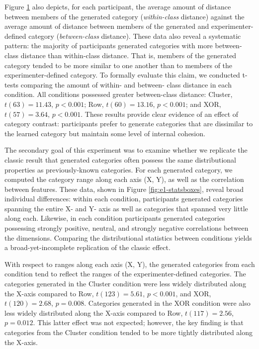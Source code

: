 \documentclass[12pt]{article}
\newcommand\nbcnote[1]{\todo[inline, backgroundcolor = yellow]{\textbf{NBC}: #1}}
\begin{document}
\begin{flushleft}
\begin{figure}
\begin{center}
    \nbcnote{Need to check on how nice the journal is about color figs!}

    \label{fig:e1-distanceplots}
    \end{center}
\end{figure}


Figure \ref{fig:e1-distanceplots} also depicts, for each participant, the average amount of distance between members of the generated category (\textit{within-class} distance) against the average amount of distance between members of the generated and experimenter-defined category (\textit{between-class} distance). These data also reveal a systematic pattern: the majority of participants generated categories with more between-class distance than within-class distance. That is, members of the generated category tended to be more similar to one another than to members of the experimenter-defined category. To formally evaluate this claim, we conducted t-tests comparing the amount of within- and between- class distance in each condition. All conditions possessed greater between-class distance: Cluster, $t(63) = 11.43$, $p < 0.001$; Row, $t(60) = 13.16$, $p < 0.001$; and XOR, $t(57) = 3.64$, $p < 0.001$. These results provide clear evidence of an effect of category contrast: participants prefer to generate categories that are dissimilar to the learned category but maintain some level of internal cohesion. 

The secondary goal of this experiment was to examine whether we replicate the classic result that generated categories often possess the same distributional properties as previously-known categories. For each generated category, we computed the category range along each axis (X, Y), as well as the correlation between features. These data, shown in Figure \ref{fig:e1-statsboxes}, reveal broad individual differences: within each condition, participants generated categories spanning the entire X- and Y- axis as well as categories that spanned very little along each. Likewise, in each condition participants generated categories possessing strongly positive, neutral, and strongly negative correlations between the dimensions. Comparing the distributional statistics between conditions yields a broad-yet-incomplete replication of the classic effect. 

With respect to ranges along each axis (X, Y), the generated categories from each condition tend to reflect the ranges of the experimenter-defined categories. The categories generated in the Cluster condition were less widely distributed along the X-axis compared to Row, $t(123) = 5.61$, $p < 0.001$, and XOR, $t(120) = 2.68$, $p = 0.008$. Categories generated in the XOR condition were also less widely distributed along the X-axis compared to Row, $t(117) = 2.56$, $p = 0.012$. This latter effect was not expected; however, the key finding is that categories from the Cluster condition tended to be more tightly distributed along the X-axis.


\end{flushleft}
\end{document}
